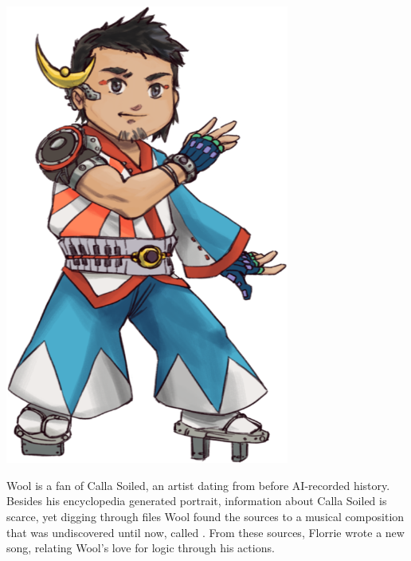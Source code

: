 \vspace{.3cm}
\begin{minipage}{0.3\textwidth}
\includegraphics[width=0.7\textwidth]{Assets/calla}
\end{minipage}
\begin{minipage}{0.7\textwidth}
    Wool is a fan of Calla Soiled, an artist dating from before AI-recorded history.
    Besides his encyclopedia generated portrait, information about Calla Soiled is scarce, yet digging through files Wool found the sources to a musical composition that was undiscovered until now, called . From these sources, Florrie wrote a new song, relating Wool's love for logic through his actions.\\
\hfill 
\end{minipage}

\clearpage